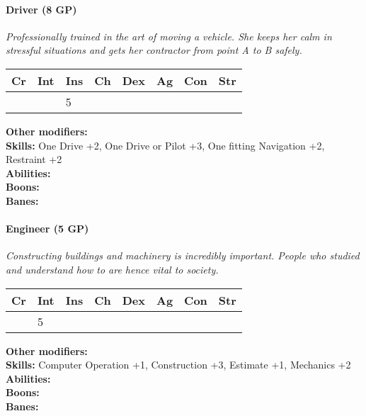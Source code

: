\paragraph*{Driver (8 GP)}
\textit{Professionally trained in the art of moving a vehicle. She keeps her calm in stressful situations and gets her contractor from point A to B safely.}\par
\begin{tabular}{|l|l|l|l|l|l|l|l|}
	\hline
	Cr & Int & Ins & Ch & Dex & Ag & Con & Str \\ \hline
	&  & 5 &  &  &  &  &  \\ \hline
\end{tabular}\par
\noindent\textbf{Other modifiers:} \\
\textbf{Skills:} One Drive +2,
One Drive or Pilot +3,
One fitting Navigation +2,
Restraint +2\\
\textbf{Abilities:} \\
\textbf{Boons:} \\
\textbf{Banes:} \\

\hrulefill
\paragraph*{Engineer (5 GP)}
\textit{Constructing buildings and machinery is incredibly important. People who studied and understand how to are hence vital to society.}\par
\begin{tabular}{|l|l|l|l|l|l|l|l|}
	\hline
	Cr & Int & Ins & Ch & Dex & Ag & Con & Str \\ \hline
	& 5 &  &  &  &  &  &  \\ \hline
\end{tabular}\par
\noindent\textbf{Other modifiers:} \\
\textbf{Skills:} Computer Operation +1,
Construction +3,
Estimate +1,
Mechanics +2\\
\textbf{Abilities:} \\
\textbf{Boons:} \\
\textbf{Banes:} \\

\hrulefill
